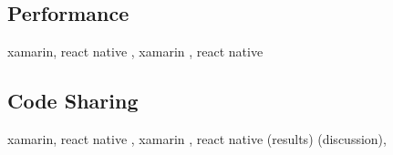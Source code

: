 \documentclass[Bachelor,BIF,english]{twbook}
\begin{document}
\subsection{Performance}
xamarin, react native \cite[p.~30-32]{ZubaBernhard2017EdPb}, xamarin \cite{Armgren_2015} \cite{WillocxVossaertNaessens2015}, react native \cite[p.~67-68]{Axelsson2016} \cite[p.~34-43,56]{Hansson_Vidhall_2016}

\subsection{Code Sharing}
xamarin, react native \cite[p.~71-72]{ZubaBernhard2017EdPb}, xamarin \cite[p.~185]{MartinezLecomte2017}, react native (results\cite[p.~44]{Hansson_Vidhall_2016}) (discussion\cite[p.~53]{Hansson_Vidhall_2016}),
\end{document}
